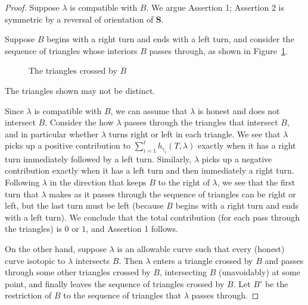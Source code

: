 \documentclass{amsart}
\theoremstyle{definition}
\theoremstyle{remark}
\numberwithin{equation}{section}
\newcommand{\0}{{\mathbf{0}}}
\renewcommand{\S}{\mathbf{S}}
\begin{document}
\begin{proof}
Suppose $\lambda$ is compatible with $B$.
We argue Assertion 1;  Assertion 2 is symmetric by a reversal of orientation of $\S$.

Suppose $B$ begins with a right turn and ends with a left turn, and consider the sequence of triangles whose interiors $B$ passes through, as shown in Figure~\ref{tri seq}.
\begin{figure}
\caption{The triangles crossed by $B$}
\label{tri seq}
\end{figure}
The triangles shown may not be distinct.

Since $\lambda$ is compatible with $B$, we can assume that $\lambda$ is honest and does not intersect $B$.
Consider the how $\lambda$ passes through the triangles that intersect $B$, and in particular whether $\lambda$ turns right or left in each triangle.
We see that $\lambda$ picks up a positive contribution to $\sum_{i=1}^\ell b_{\gamma_i}(T,\lambda)$ exactly when it has a right turn immediately followed by a left turn.
Similarly, $\lambda$ picks up a negative contribution exactly when it has a left turn and then immediately a right turn.
Following $\lambda$ in the direction that keeps $B$ to the right of $\lambda$, we see that the first turn that $\lambda$ makes as it passes through the sequence of triangles can be right or left, but the last turn must be left (because $B$ begins with a right turn and ends with a left turn).
We conclude that the total contribution (for each pass through the triangles) is $0$ or $1$, and Assertion 1 follows.

On the other hand, suppose $\lambda$ is an allowable curve such that every (honest) curve isotopic to $\lambda$ intersects $B$.
Then $\lambda$ enters a triangle crossed by $B$ and passes through some other triangles crossed by $B$, intersecting $B$ (unavoidably) at some point, and finally leaves the sequence of triangles crossed by $B$.
Let $B'$ be the restriction of $B$ to the sequence of triangles that $\lambda$ passes through. 


\end{proof}
\end{document}
